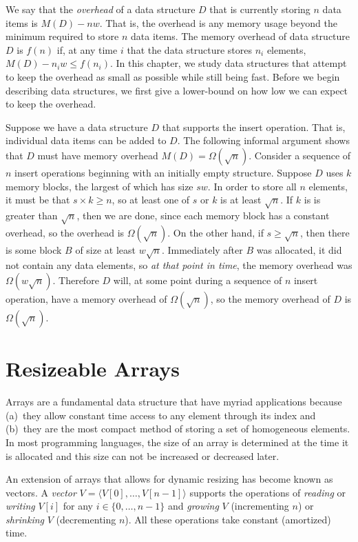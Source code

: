 We say that the \emph{overhead} of a data structure $D$ that is currently
storing $n$ data items is $M(D)-nw$.  That is, the overhead is any memory
usage beyond the minimum required to store $n$ data items.  The memory
overhead of data structure $D$ is $f(n)$ if, at any time $i$ that the data
structure stores $n_i$ elements, $M(D)-n_iw \le f(n_i)$.  In this chapter,
we study data structures that attempt to keep the overhead as small as
possible while still being fast.  Before we begin describing data
structures, we first give a lower-bound on how low we can expect to keep
the overhead.

Suppose we have a data structure $D$ that supports the insert operation.
That is, individual data items can be added to $D$.  The following informal
argument shows that $D$ must have memory overhead $M(D)=\Omega(\sqrt{n})$.
Consider a sequence of $n$ insert operations beginning with an initially
empty structure. Suppose $D$ uses $k$ memory blocks, the largest of which
has size $sw$.  In order to store all $n$ elements, it must be that
$s\times k \ge n$, so at least one of $s$ or $k$ is at least $\sqrt{n}$.
If $k$ is is greater than $\sqrt{n}$, then we are done, since each memory
block has a constant overhead, so the overhead is $\Omega(\sqrt{n})$.  On
the other hand, if $s\ge \sqrt{n}$, then there is some block $B$ of size at
least $w\sqrt{n}$.  Immediately after $B$ was allocated, it did not contain
any data elements, so \emph{at that point in time}, the memory overhead was
$\Omega(w\sqrt{n})$.  Therefore $D$ will, at some point during a sequence
of $n$ insert operation, have a memory overhead of $\Omega(\sqrt{n})$, so
the memory overhead of $D$ is $\Omega(\sqrt{n})$.



\section{Resizeable Arrays}

Arrays are a fundamental data structure that have myriad applications
because (a)~they allow constant time access to any element through its
index and (b)~they are the most compact method of storing a set of
homogeneous elements.  In most programming languages, the size of an array
is determined at the time it is allocated and this size can not be
increased or decreased later.

An extension of arrays that allows for dynamic resizing has become known as
vectors.  A \emph{vector} $V=\langle V[0],\ldots,V[n-1]\rangle$ supports
the operations of \emph{reading} or \emph{writing} $V[i]$ for any
$i\in\{0,\ldots,n-1\}$ and \emph{growing} $V$ (incrementing $n$) or
\emph{shrinking} $V$ (decrementing $n$).  All these operations take
constant (amortized) time.

